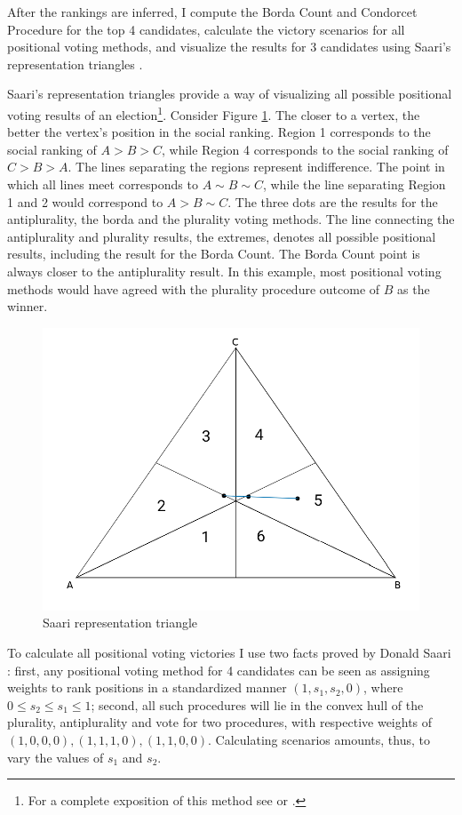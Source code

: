 \documentclass[hidelinks,11pt]{article}
\begin{document}
After the rankings are inferred, I compute the Borda Count and Condorcet Procedure for the top
4 candidates, calculate the victory scenarios for all positional voting methods,  and visualize the results for 3 candidates using Saari's representation triangles \parencite{saari2012geometry}.

Saari's representation triangles provide a way of visualizing all possible
positional voting results of an election\footnote{For a complete exposition of
  this method see \textcite{saari1995basic} or \textcite{nurmi2002voting}.}. Consider Figure \ref{fig:saari_nurmi}. The closer to a vertex, the better the vertex's position in the social ranking. Region 1 corresponds to the social ranking of \(A > B > C\), while Region 4 corresponds to the social ranking of \(C>B>A\). The lines separating the regions represent indifference. The point in which all lines meet corresponds to \(A \sim B \sim C\), while the line separating Region 1 and 2 would correspond to \(A > B \sim C\). The three dots are the results for the antiplurality, the borda and the plurality voting methods. The line connecting the antiplurality and plurality results, the extremes, denotes all possible positional results, including the result for the Borda Count. The Borda Count point is always closer to the antiplurality result. In this example, most positional voting methods would have agreed with the plurality procedure outcome of \(B\) as the winner.

\begin{figure}[H]
 \centering
 \includegraphics[width=0.8\columnwidth,
 height=0.3\textheight]{./images/simpletriangle.png}
 \caption{Saari representation triangle}
 \label{fig:saari_nurmi}
\end{figure}

To calculate all positional voting victories I use two facts proved by Donald Saari \parencite{saari2012geometry, saari2001chaotic}: first, any positional voting method for 4 candidates can be seen as assigning weights to rank positions in a standardized manner \((1,s_{1},s_{2},0)\), where \(0 \leq s_{2} \leq s_{1} \leq 1\); second, all such procedures will lie in the convex hull of the plurality, antiplurality and vote for two procedures, with respective weights of \((1,0,0,0), (1,1,1,0), (1,1,0,0)\). Calculating scenarios amounts, thus, to vary the values of \(s_{1}\) and \(s_{2}\).
\end{document}
